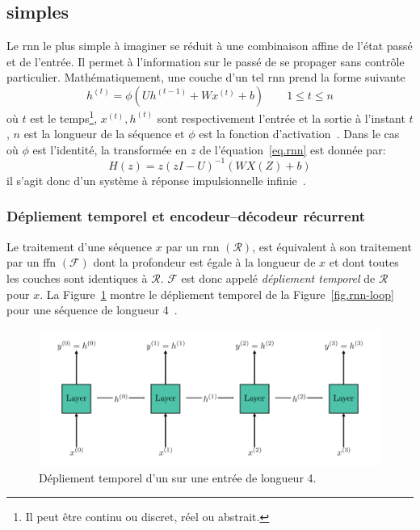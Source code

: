\subsection{ simples}

Le \gls{rnn} le plus simple à imaginer se réduit à une combinaison affine de l'état passé et de l'entrée.
Il permet à l'information sur le passé de se propager sans contrôle particulier.
Mathématiquement, une couche d'un tel \gls{rnn} prend la forme suivante 
\begin{equation}
    \label{eq.rnn}
    h^{(t)} = \phi\left(Uh^{(t-1)} + Wx^{(t)} + b\right) \qquad 1 \le t \le n
\end{equation}
où \(t\) est le temps\footnote{Il peut être continu ou discret, réel ou abstrait.},
\(x^{(t)}, h^{(t)}\) sont respectivement l'entrée et la sortie à l'instant \(t\), 
\(n\) est la longueur de la séquence et \(\phi\) est la fonction d'activation~\cite{Fathi_2021}.
Dans le cas où \(\phi\) est l'identité,  
la transformée en \(z\) de l'équation~\ref{eq.rnn} est donnée par:
\begin{equation}
    \label{eq.rnn-tz}
    H(z) = z\left(zI - U\right)^{-1} \left(WX(Z) + b\right)
\end{equation}
il s'agit donc d'un système à réponse impulsionnelle infinie~\cite{Fathi_2021}.

\subsubsection{Dépliement temporel et encodeur--décodeur récurrent}

Le traitement d'une séquence \(x\) par un \gls{rnn} \((\mathcal{R})\), 
est équivalent à son traitement par un \gls{ffn} \((\mathcal{F})\) dont la profondeur est égale à la longueur de \(x\)
et dont toutes les couches sont identiques à \(\mathcal{R}\).
\(\mathcal{F}\) est donc appelé \emph{dépliement temporel} de \(\mathcal{R}\) pour \(x\).
La Figure~\ref{fig.rnn-unfold} montre le dépliement temporel de la Figure~\ref{fig.rnn-loop} 
pour une séquence de longueur 4~\cite{LeCun_Bengio_Hinton_2015}.

\begin{figure}[hbt]
    \centering
    \includegraphics[width=\textwidth]{assets/images/rnn-unfolding.png}
    \caption{Dépliement temporel d'un  sur une entrée de longueur 4.}
    \label{fig.rnn-unfold}
\end{figure}

